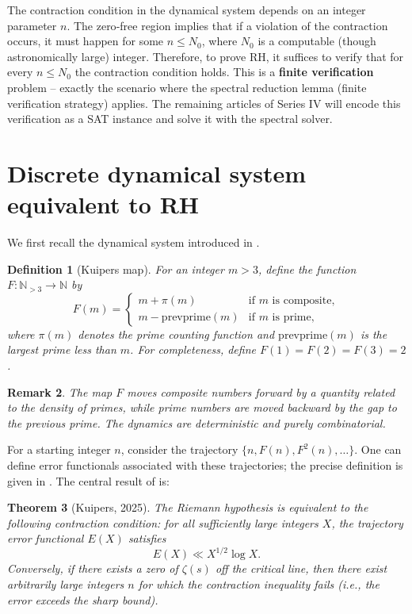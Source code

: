 \documentclass[11pt,a4paper]{article}
\newtheorem{theorem}{Theorem}[section]
\newtheorem{definition}[theorem]{Definition}
\newtheorem{remark}[theorem]{Remark}
\begin{document}
The contraction condition in the dynamical system depends on an integer parameter $n$. The zero‑free region implies that if a violation of the contraction occurs, it must happen for some $n \le N_0$, where $N_0$ is a computable (though astronomically large) integer. Therefore, to prove RH, it suffices to verify that for every $n \le N_0$ the contraction condition holds. This is a \textbf{finite verification} problem – exactly the scenario where the spectral reduction lemma (finite verification strategy) applies. The remaining articles of Series IV will encode this verification as a SAT instance and solve it with the spectral solver.

\section{Discrete dynamical system equivalent to RH}

We first recall the dynamical system introduced in \cite{kuipers2025}.

\begin{definition}[Kuipers map]
\label{def:kuipers}
For an integer $m > 3$, define the function $F: \mathbb{N}_{>3} \to \mathbb{N}$ by
\[
F(m) = \begin{cases}
m + \pi(m) & \text{if } m \text{ is composite},\\
m - \mathrm{prevprime}(m) & \text{if } m \text{ is prime},
\end{cases}
\]
where $\pi(m)$ denotes the prime counting function and $\mathrm{prevprime}(m)$ is the largest prime less than $m$. For completeness, define $F(1)=F(2)=F(3)=2$.
\end{definition}

\begin{remark}
The map $F$ moves composite numbers forward by a quantity related to the density of primes, while prime numbers are moved backward by the gap to the previous prime. The dynamics are deterministic and purely combinatorial.
\end{remark}

For a starting integer $n$, consider the trajectory $\{n, F(n), F^2(n), \dots\}$. One can define error functionals associated with these trajectories; the precise definition is given in \cite[§3]{kuipers2025}. The central result of \cite{kuipers2025} is:

\begin{theorem}[Kuipers, 2025]
\label{thm:kuipers}
The Riemann hypothesis is equivalent to the following contraction condition: for all sufficiently large integers $X$, the trajectory error functional $E(X)$ satisfies
\[
E(X) \ll X^{1/2} \log X.
\]
Conversely, if there exists a zero of $\zeta(s)$ off the critical line, then there exist arbitrarily large integers $n$ for which the contraction inequality fails (i.e., the error exceeds the sharp bound).
\end{theorem}
\end{document}
